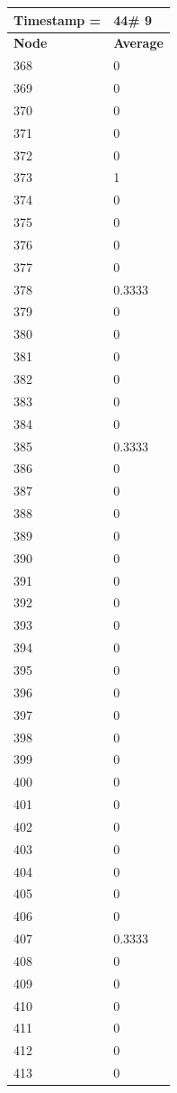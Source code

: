 \begin{tabular}{|l||l|}
\hline
\textbf{Timestamp =} & \textbf{44}\# 9\\\hline
	\textbf{Node} & \textbf{Average} \\ \hline
\hline
	368 & 0 \\ \hline
	369 & 0 \\ \hline
	370 & 0 \\ \hline
	371 & 0 \\ \hline
	372 & 0 \\ \hline
	373 & 1 \\ \hline
	374 & 0 \\ \hline
	375 & 0 \\ \hline
	376 & 0 \\ \hline
	377 & 0 \\ \hline
	378 & 0.3333 \\ \hline
	379 & 0 \\ \hline
	380 & 0 \\ \hline
	381 & 0 \\ \hline
	382 & 0 \\ \hline
	383 & 0 \\ \hline
	384 & 0 \\ \hline
	385 & 0.3333 \\ \hline
	386 & 0 \\ \hline
	387 & 0 \\ \hline
	388 & 0 \\ \hline
	389 & 0 \\ \hline
	390 & 0 \\ \hline
	391 & 0 \\ \hline
	392 & 0 \\ \hline
	393 & 0 \\ \hline
	394 & 0 \\ \hline
	395 & 0 \\ \hline
	396 & 0 \\ \hline
	397 & 0 \\ \hline
	398 & 0 \\ \hline
	399 & 0 \\ \hline
	400 & 0 \\ \hline
	401 & 0 \\ \hline
	402 & 0 \\ \hline
	403 & 0 \\ \hline
	404 & 0 \\ \hline
	405 & 0 \\ \hline
	406 & 0 \\ \hline
	407 & 0.3333 \\ \hline
	408 & 0 \\ \hline
	409 & 0 \\ \hline
	410 & 0 \\ \hline
	411 & 0 \\ \hline
	412 & 0 \\ \hline
	413 & 0 \\ \hline
\end{tabular}

